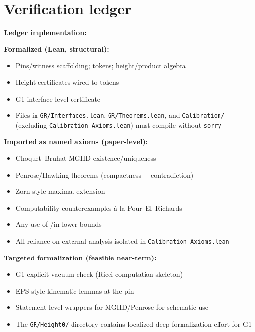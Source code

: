 \documentclass[11pt]{article}
\theoremstyle{definition}
\theoremstyle{remark}
\newcommand{\WLPO}{\mathrm{WLPO}}
\newcommand{\LEM}{\mathrm{LEM}}
\begin{document}
\section{Verification ledger}
\begin{mdframed}[style=status]
\textbf{Ledger implementation:}

\textbf{Formalized (Lean, structural):}
\begin{itemize}
\item Pins/witness scaffolding; tokens; height/product algebra
\item Height certificates wired to tokens
\item G1 interface-level certificate
\item Files in \texttt{GR/Interfaces.lean}, \texttt{GR/Theorems.lean}, and \texttt{Calibration/} (excluding \texttt{Calibration\_Axioms.lean}) must compile without \texttt{sorry}
\end{itemize}

\textbf{Imported as named axioms (paper-level):}
\begin{itemize}
\item Choquet--Bruhat MGHD existence/uniqueness
\item Penrose/Hawking theorems (compactness + contradiction)
\item Zorn-style maximal extension
\item Computability counterexamples à la Pour--El--Richards
\item Any use of \LEM/\WLPO in lower bounds
\item All reliance on external analysis isolated in \texttt{Calibration\_Axioms.lean}
\end{itemize}

\textbf{Targeted formalization (feasible near-term):}
\begin{itemize}
\item G1 explicit vacuum check (Ricci computation skeleton)
\item EPS-style kinematic lemmas at the pin
\item Statement-level wrappers for MGHD/Penrose for schematic use
\item The \texttt{GR/Height0/} directory contains localized deep formalization effort for G1
\end{itemize}
\end{mdframed}
\end{document}
